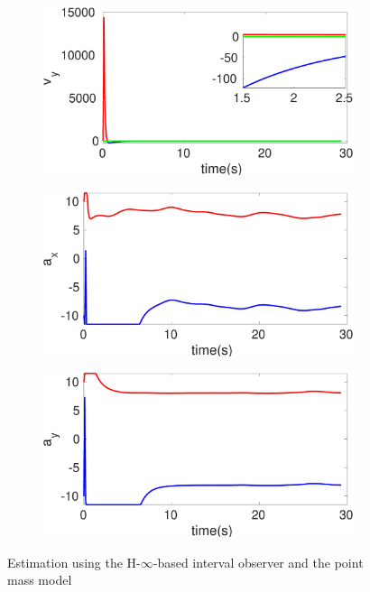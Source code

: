 \begin{figure}[!h]
\begin{subfigure}{.5\linewidth}
\end{subfigure}
\begin{subfigure}{.5\linewidth}
\centering
\includegraphics[width=\linewidth]{figures/HInf/s3pmHInfv_y}
\end{subfigure}
\begin{subfigure}{.5\linewidth}
\centering
\includegraphics[width=\linewidth]{figures/HInf/s3pmHInfa_x}
\end{subfigure}
\begin{subfigure}{.5\linewidth}
\centering
\includegraphics[width=\linewidth]{figures/HInf/s3pmHInfa_y}
\end{subfigure}
\caption{Estimation using the H-$\infty$-based interval observer and the point mass model}
\end{figure}


